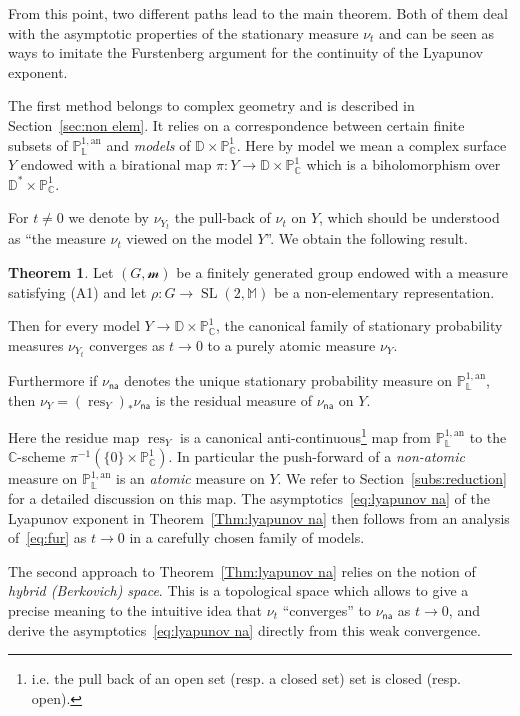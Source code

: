 \documentclass[11pt]{article}
\theoremstyle{definition}
\numberwithin{equation}{section}
\numberwithin{figure}{section}
\numberwithin{table}{section}
\DeclareMathOperator{\SL}{SL}
\DeclareMathOperator{\res}{res}
\newcommand{\cc}{\mathbb{C}}
\newcommand{\dD}{\mathbb{D}}
\newcommand{\sm}{\mathcal{m}}
\newcommand{\mm}{\mathbb{M}}
\newcommand{\D}{\mathbb{D}}
\newcommand{\an}{\mathrm{an}}
\newcommand{\cv}{\rightarrow}
\newcommand{\PP}{\mathbb{P}}
\newcommand{\Laurent}{\mathbb{L}}
\newcommand{\na}{\mathsf{na}}
\newtheorem{mthm}{Theorem}
\begin{document}

From this point, two different paths lead to the main theorem. Both of them deal with the asymptotic properties of the stationary measure $\nu_t$ and can be seen as ways to imitate the Furstenberg argument for the continuity of the Lyapunov exponent.


The first method belongs to complex geometry and is described in Section~\ref{sec:non elem}. It relies on a correspondence between certain finite subsets of $\PP^{1,\an}_{\Laurent}$ and \emph{models} of $\D \times \PP^1_\cc $. Here by model we mean a complex surface $Y$ endowed with a birational map $\pi: Y \to \D \times \PP^1_\cc$ which is a biholomorphism over $\D^*\times \PP^1_\cc$.

For $t\neq 0$ we denote by $\nu_{Y_t}$ the pull-back of $\nu_t$ on $Y$, which should be understood as ``the measure $\nu_t$ viewed on the model $Y$''. We obtain the following result.

\begin{mthm}\label{Thm:atomic}
Let $(G, \sm)$ be a finitely generated group endowed with a measure satisfying (A1) and let $\rho: G\to \SL(2, \mm)$ be a non-elementary representation.

Then for every model $Y\cv \dD\times \PP^1_\cc$, the canonical family of stationary probability measures $\nu_{Y_t}$ converges as $t\to 0$ to a purely atomic measure $\nu_{Y}$.

Furthermore if $\nu_\na$ denotes the unique stationary probability measure on $\PP^{1,\an}_{\Laurent}$, then $\nu_Y = (\res_Y)_*\nu_\na$ is the residual measure of $\nu_\na$ on $Y$.
\end{mthm}

Here the residue map $\res_Y$ is a canonical anti-continuous\footnote{i.e. the pull back of an open set (resp. a closed set) set is closed (resp. open).} map from $\PP^{1,\an}_{\Laurent}$ to the $\cc$-scheme $\pi^{-1}(\{ 0 \} \times \PP^1_\cc)$. In particular the push-forward of a \emph{non-atomic} measure on $\PP^{1,\an}_{\Laurent}$ is an \emph{atomic} measure on $Y$. We refer to Section~\ref{subs:reduction} for a detailed discussion on this map. The asymptotics~\eqref{eq:lyapunov na} of the Lyapunov exponent in Theorem~\ref{Thm:lyapunov na} then follows from an analysis of~\eqref{eq:fur} as $t\cv 0$ in a carefully chosen family of models.


The second approach to Theorem~\ref{Thm:lyapunov na} relies on the notion of \emph{hybrid (Berkovich) space}. This is a topological space which allows to give a precise meaning to the intuitive idea that $\nu_t$ ``converges'' to $\nu_\na$ as $t\to 0$, and derive the asymptotics~\eqref{eq:lyapunov na} directly from this weak convergence.
\end{document}
